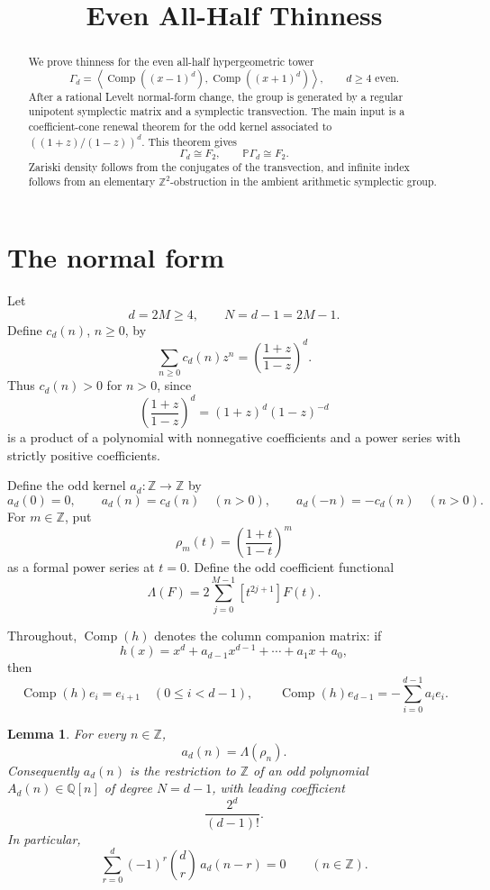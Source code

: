 \documentclass[a4paper,11pt]{amsart}
\title{Even All-Half Thinness}
\date{}
\newtheorem{lemma}[theorem]{Lemma}
\theoremstyle{remark}
\newcommand{\Z}{\mathbb Z}
\newcommand{\Q}{\mathbb Q}
\newcommand{\PP}{\mathbb P}
\DeclareMathOperator{\Comp}{Comp}
\numberwithin{equation}{section}
\begin{document}
\begin{abstract}
We prove thinness for the even all-half hypergeometric tower
\[
        \Gamma_d=
        \left\langle
        \Comp((x-1)^d),\Comp((x+1)^d)
        \right\rangle,
        \qquad d\ge4\text{ even}.
\]
After a rational Levelt normal-form change, the group is generated by a regular unipotent symplectic matrix and a symplectic transvection.  The main input is a coefficient-cone renewal theorem for the odd kernel associated to \(((1+z)/(1-z))^d\).  This theorem gives
\[
        \Gamma_d\cong F_2,
        \qquad
        \PP\Gamma_d\cong F_2.
\]
Zariski density follows from the conjugates of the transvection, and infinite index follows from an elementary \(\Z^2\)-obstruction in the ambient arithmetic symplectic group.
\end{abstract}

\maketitle

\section{The normal form}

Let
\[
        d=2M\ge4,
        \qquad
        N=d-1=2M-1.
\]
Define \(c_d(n)\), \(n\ge0\), by
\[
        \sum_{n\ge0}c_d(n)z^n
        =
        \left(\frac{1+z}{1-z}\right)^d.
\]
Thus \(c_d(n)>0\) for \(n>0\), since
\[
        \left(\frac{1+z}{1-z}\right)^d
        =
        (1+z)^d(1-z)^{-d}
\]
is a product of a polynomial with nonnegative coefficients and a power series with strictly positive coefficients.

Define the odd kernel \(a_d:\Z\to\Z\) by
\[
        a_d(0)=0,
        \qquad
        a_d(n)=c_d(n)\quad(n>0),
        \qquad
        a_d(-n)=-c_d(n)\quad(n>0).
\]
For \(m\in\Z\), put
\[
        \rho_m(t)=\left(\frac{1+t}{1-t}\right)^m
\]
as a formal power series at \(t=0\).  Define the odd coefficient functional
\[
        \Lambda(F)=2\sum_{j=0}^{M-1}[t^{2j+1}]F(t).
\]

Throughout, \(\Comp(h)\) denotes the column companion matrix: if
\[
        h(x)=x^d+a_{d-1}x^{d-1}+\cdots+a_1x+a_0,
\]
then
\[
        \Comp(h)e_i=e_{i+1}\quad(0\le i<d-1),
        \qquad
        \Comp(h)e_{d-1}=-\sum_{i=0}^{d-1}a_i e_i.
\]

\begin{lemma}\label{lem:kernel-polynomial}
For every \(n\in\Z\),
\[
        a_d(n)=\Lambda(\rho_n).
\]
Consequently \(a_d(n)\) is the restriction to \(\Z\) of an odd polynomial \(A_d(n)\in\Q[n]\) of degree \(N=d-1\), with leading coefficient
\[
        \frac{2^d}{(d-1)!}.
\]
In particular,
\[
        \sum_{r=0}^{d}(-1)^r\binom dr\,a_d(n-r)=0
        \qquad(n\in\Z).
\]
\end{lemma}
\end{document}
